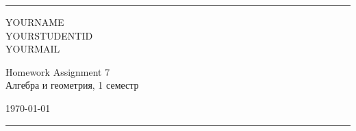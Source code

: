 \documentclass[a4paper, 12pt]{article}
\begin{document}

\fancyhead[C]{}
\hrule \medskip %
\begin{minipage}{0.295\textwidth} 
\raggedright\footnotesize
YOURNAME \hfill\\   
YOURSTUDENTID \hfill\\
YOURMAIL
\end{minipage}
\begin{minipage}{0.4\textwidth} 
\centering\large 
Homework Assignment 7\\ 
\normalsize 
Алгебра и геометрия, 1 семестр\\ 
\end{minipage}
\begin{minipage}{0.295\textwidth} 
\raggedleft
\today\hfill\\
\end{minipage}
\medskip\hrule 
\bigskip

\end{document}
